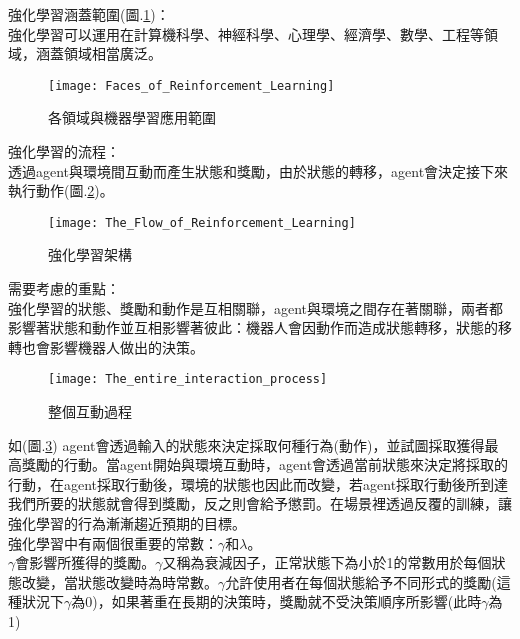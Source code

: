 強化學習涵蓋範圍(圖.\ref{各領域與機器學習應用範圍})：\\
 強化學習可以運用在計算機科學、神經科學、心理學、經濟學、數學、工程等領域，涵蓋領域相當廣泛。
\begin{figure}[hbt!]
\begin{center}
\texttt{[image: Faces\_of\_Reinforcement\_Learning]}
\caption{\Large 各領域與機器學習應用範圍}
\label{各領域與機器學習應用範圍}
\end{center}
\end{figure}
\newpage
強化學習的流程：\\
透過agent與環境間互動而產生狀態和獎勵，由於狀態的轉移，agent會決定接下來執行動作(圖.\ref{RL structur})。\\[12pt]

\begin{figure}[hbt!]
\begin{center}
\texttt{[image: The\_Flow\_of\_Reinforcement\_Learning]}
\caption{\Large 強化學習架構}
\label{RL structur}
\end{center}
\end{figure}
需要考慮的重點：\\
強化學習的狀態、獎勵和動作是互相關聯，agent與環境之間存在著關聯，兩者都影響著狀態和動作並互相影響著彼此：機器人會因動作而造成狀態轉移，狀態的移轉也會影響機器人做出的決策。\\
\newpage
\begin{figure}[hbt!]
\begin{center}
\texttt{[image: The\_entire\_interaction\_process]}
\caption{\Large 整個互動過程}
\label{整個互動過程}
\end{center}
\end{figure}
 如(圖.\ref{整個互動過程}) agent會透過輸入的狀態來決定採取何種行為(動作)，並試圖採取獲得最高獎勵的行動。當agent開始與環境互動時，agent會透過當前狀態來決定將採取的行動，在agent採取行動後，環境的狀態也因此而改變，若agent採取行動後所到達我們所要的狀態就會得到獎勵，反之則會給予懲罰。在場景裡透過反覆的訓練，讓強化學習的行為漸漸趨近預期的目標。\\
 強化學習中有兩個很重要的常數：$\gamma$和$\lambda$。\\
 
$\gamma$會影響所獲得的獎勵。$\gamma$又稱為衰減因子，正常狀態下為小於1的常數用於每個狀態改變，當狀態改變時為時常數。$\gamma$允許使用者在每個狀態給予不同形式的獎勵(這種狀況下$\gamma$為0)，如果著重在長期的決策時，獎勵就不受決策順序所影響(此時$\gamma$為1)\\

